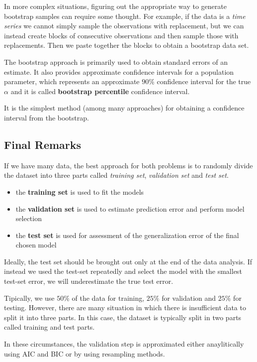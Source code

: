 In more complex situations, figuring out the appropriate way to generate bootstrap samples can require some thought. For example, if the data is a \textit{time series} we cannot simply sample the observations with replacement, but we can instead create blocks of consecutive observations and then sample those with replacements. Then we paste together the blocks to obtain a bootstrap data set.


The bootstrap approach is primarily used to obtain standard errors of an estimate. It also provides approximate confidence intervals for a population parameter, which represents an approximate $90\%$ confidence interval for the true $\alpha$ and it is called \textbf{bootstrap percentile} confidence interval.

It is the simplest method (among many approaches) for obtaining a confidence interval from the bootstrap.

\subsection*{Final Remarks}
If we have many data, the best approach for both problems is to randomly divide the dataset into three parts called \textit{training set}, \textit{validation set} and \textit{test set}.

\begin{itemize}
    \item the \textbf{training set} is used to fit the models
    \item the \textbf{validation set} is used to estimate prediction error and perform model selection
    \item the \textbf{test set} is used for assessment of the generalization error of the final chosen model
\end{itemize}

Ideally, the test set should be brought out only at the end of the data analysis. If instead we used the test-set repeatedly and select the model with the smallest test-set error, we will underestimate the true test error.

Tipically, we use $50\%$ of the data for training, $25\%$ for validation and $25\%$ for testing. However, there are many situation in which there is insufficient data to split it into three parts. In this case, the dataset is typically split in two parts called training and test parts.

In these circumstances, the validation step is approximated either anaylitically using AIC and BIC or by using resampling methods.

